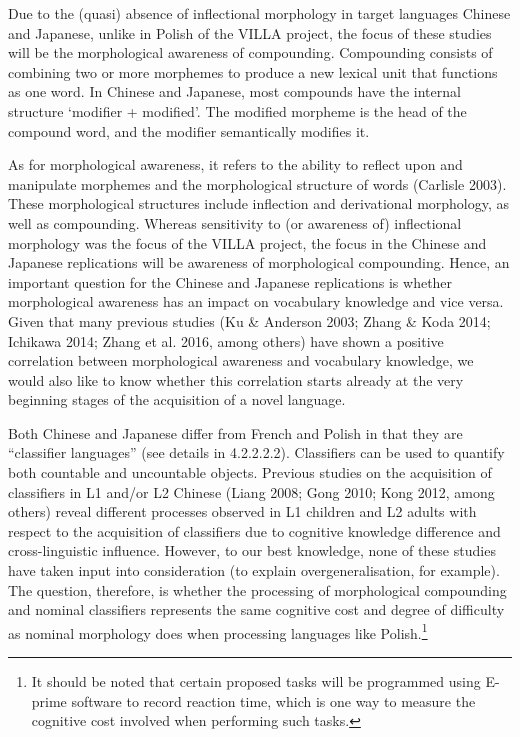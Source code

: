 \documentclass[12pt]{article}
\newenvironment{styleStandard}{\setlength\leftskip{0cm}\setlength\rightskip{0cm plus 1fil}\setlength\parindent{0cm}\setlength\parfillskip{0pt plus 1fil}\setlength\parskip{0cm plus 1pt}\writerlistparindent\writerlistleftskip\leavevmode\normalfont\normalsize\writerlistlabel\ignorespaces}{\unskip\vspace{0cm plus 1pt}\par}
\newcommand\writerlistleftskip{}
\newcommand\writerlistparindent{}
\newcommand\writerlistlabel{}
\begin{document}
\begin{styleStandard}
Due to the (quasi) absence of inflectional morphology in target languages Chinese and Japanese, unlike in Polish of the VILLA project, the focus of these studies will be the morphological awareness of compounding. Compounding consists of combining two or more morphemes to produce a new lexical unit that functions as one word. In Chinese and Japanese, most compounds have the internal structure ‘modifier + modified’. The modified morpheme is the head of the compound word, and the modifier semantically modifies it.
\end{styleStandard}

\begin{styleStandard}
As for morphological awareness, it refers to the ability to reflect upon and manipulate morphemes and the morphological structure of words (Carlisle 2003). These morphological structures include inflection and derivational morphology, as well as compounding. Whereas sensitivity to (or awareness of) inflectional morphology was the focus of the VILLA project, the focus in the Chinese and Japanese replications will be awareness of morphological compounding. Hence, an important question for the Chinese and Japanese replications is whether morphological awareness has an impact on vocabulary knowledge and vice versa. Given that many previous studies (Ku \& Anderson 2003; Zhang \& Koda 2014; Ichikawa 2014; Zhang et al. 2016, among others) have shown a positive correlation between morphological awareness and vocabulary knowledge, we would also like to know whether this correlation starts already at the very beginning stages of the acquisition of a novel language.
\end{styleStandard}

\begin{styleStandard}
Both Chinese and Japanese differ from French and Polish in that they are “classifier languages” (see details in 4.2.2.2.2). Classifiers can be used to quantify both countable and uncountable objects. Previous studies on the acquisition of classifiers in L1 and/or L2 Chinese (Liang 2008; Gong 2010; Kong 2012, among others) reveal different processes observed in L1 children and L2 adults with respect to the acquisition of classifiers due to cognitive knowledge difference and cross-linguistic influence. However, to our best knowledge, none of these studies have taken input into consideration (to explain overgeneralisation, for example). The question, therefore, is whether the processing of morphological compounding and nominal classifiers represents the same cognitive cost and degree of difficulty as nominal morphology does when processing languages like Polish.\footnote{\textrm{ It should be noted that certain proposed tasks will be programmed using E-prime software to record reaction time, which is one way to measure the cognitive cost involved when performing such tasks.}}
\end{styleStandard}
\end{document}
